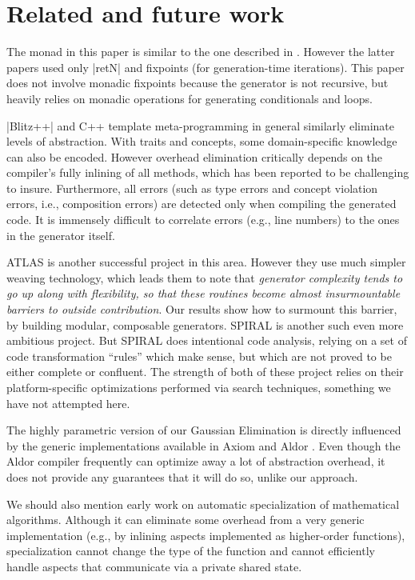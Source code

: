 \documentclass{llncs}
\begin{document}
\section{Related and future work}\label{related}

The monad in this paper is similar to the one described in
\cite{MSP:PADL04,KiselyovTaha}.  However the latter papers used only
|retN| and fixpoints (for generation-time iterations).  This paper
does not involve monadic fixpoints because the generator is not
recursive, but heavily relies on monadic operations for generating
conditionals and loops.

|Blitz++| \cite{Veldhuizen:1998:ISCOPE} and {C++} template
meta-programming in general similarly eliminate levels
of abstraction.  With traits and concepts, some domain-specific
knowledge can also be encoded.  However overhead elimination
critically depends on the compiler's fully inlining of all methods,
which has been reported to be challenging to insure. Furthermore, all
errors (such as type errors and concept violation errors, i.e.,
composition errors) are detected only when compiling the generated
code. It is immensely difficult to correlate errors (e.g., line
numbers) to the ones in the generator itself.

ATLAS \cite{ATLAS} is another successful project in this area.  However
they use much simpler weaving technology, which leads them to note
that \emph{generator complexity tends to go up along with flexibility, 
so that these routines become almost insurmountable barriers to 
outside contribution}.  Our results show how to surmount this barrier,
by building modular, composable generators.
SPIRAL \cite{Pueschel:05} is another such even more ambitious project.
But SPIRAL does intentional code analysis, relying on a set of code
transformation ``rules'' which make sense, but which are not proved 
to be either complete or confluent.  The strength of both of these
project relies on their platform-specific optimizations performed
via search techniques, something we have not attempted here.

The highly parametric version of our Gaussian Elimination is directly
influenced by the generic implementations available in Axiom
\cite{Axiom} and Aldor \cite{Watt:2002:HCA}.  Even though the Aldor
compiler frequently can optimize away a lot of abstraction overhead, 
it does not provide any guarantees that it will do so, unlike our
approach.

We should also mention early work \cite{Gluck95} on automatic
specialization of mathematical algorithms. Although it can eliminate
some overhead from a very generic implementation (e.g., by inlining
aspects implemented as higher-order functions), specialization cannot
change the type of the function and cannot efficiently handle aspects
that communicate via a private shared state.
\end{document}

